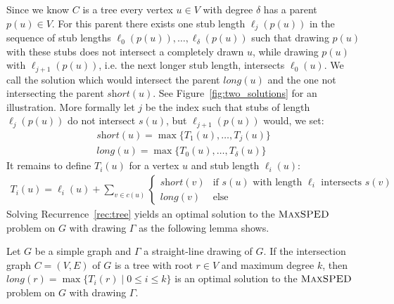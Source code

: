 \documentclass[a4paper,english,numberwithinsect]{eurocg18}
\newcommand{\maxsped}{\ensuremath{\textsc{MaxSPED}}\xspace}
\newcommand{\sollong}{\ensuremath{\textit{long}}\xspace}
\newcommand{\solshort}{\ensuremath{\textit{short}}\xspace}
\begin{document}
Since we know $ C $ is a tree every vertex $ u \in V $ with degree $ \delta $ has a parent $ p(u) \in V $. For this parent there exists one stub length $ \ell_j(p(u)) $ in the sequence of stub lengths $ \ell_0(p(u)),\dots,\ell_{\delta}(p(u)) $ such that drawing $ p(u) $ with these stubs does not intersect a completely drawn $ u $, while drawing $ p(u) $ with $ \ell_{j + 1}(p(u)) $, i.e. the next longer stub length, intersects $ \ell_0(u) $. We call the solution which would intersect the parent $ \sollong(u) $ and the one not intersecting the parent $ \solshort(u) $. See Figure~\ref{fig:two_solutions} for an illustration. More formally let $ j $ be the index such that stubs of length $ \ell_j(p(u)) $ do not intersect $ s(u) $, but $ \ell_{j +1}(p(u)) $ would, we set:
\begin{align*}
	\solshort(u) = \max\{T_1(u),\dots,T_j(u)\} \\
	\sollong(u) = \max\{T_0(u),\dots,T_{\delta}(u)\}
\end{align*}
It remains to define $ T_i(u) $ for a vertex $ u $ and stub length $ \ell_i(u) $:
\begin{align}
	\label{rec:tree}
	T_i(u) = \ell_i(u) + \sum_{v \in c(u)}
	\begin{cases}
		\solshort(v) & \text{if } s(u) \text{ with length } \ell_i \text{ intersects } s(v) \\
		\sollong(v) & \text{else}
	\end{cases}
\end{align}
Solving Recurrence~\ref{rec:tree} yields an optimal solution to the \maxsped problem on $ G $ with drawing $ \Gamma $ as the following lemma shows.

\begin{lemma}
	\label{lem:tree_correctness}	
	Let $ G $ be a simple graph and $ \Gamma $ a straight-line drawing of $ G $. If the intersection graph $ C = (V,E) $ of $ G $ is a tree with root $ r \in V $ and maximum degree $ k $, then $ \sollong(r) = \max \{T_i(r) \mid 0 \leq i \leq k \} $ is an optimal solution to the \maxsped problem on $ G $ with drawing $ \Gamma $.
\end{lemma}
\end{document}
